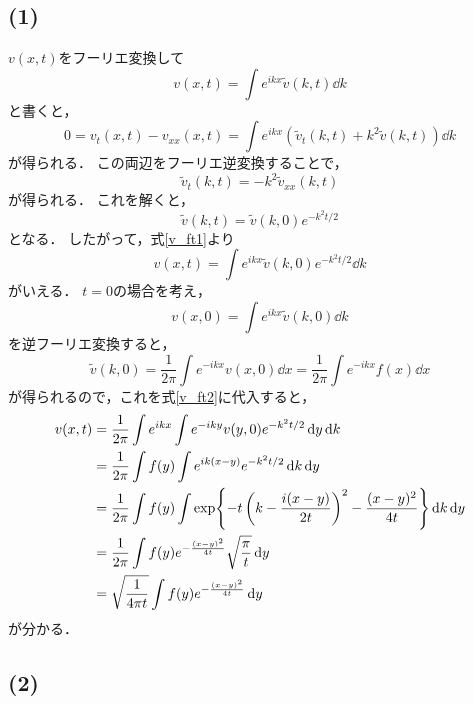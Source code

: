 \documentclass[a4paper,11pt]{jsarticle}
\begin{document}
\subsection*{(1)}
$v(x,t)$をフーリエ変換して
\begin{equation}
  v(x,t) = \int e^{ikx} \tilde{v}(k,t) \dd{k} \label{v_ft1}
\end{equation}
と書くと，
\begin{equation}
  0 = v_t(x,t) - v_{xx}(x,t) = \int e^{ikx} (\tilde{v}_t(k,t) + k^2 \tilde{v}(k,t)) \dd{k} 
\end{equation}
が得られる．
この両辺をフーリエ逆変換することで，
\begin{equation}
  \tilde{v}_t(k,t) = -k^2\tilde{v}_{xx}(k,t)
\end{equation}
が得られる．
これを解くと，
\begin{equation}
  \tilde{v}(k,t) = \tilde{v}(k,0)e^{-k^2t/2}
\end{equation}
となる．
したがって，式\eqref{v_ft1}より
\begin{equation}
  v(x,t) = \int e^{ikx} \tilde{v}(k,0)e^{-k^2t/2} \dd{k} \label{v_ft2}
\end{equation}
がいえる．
$t=0$の場合を考え，
\begin{equation}
  v(x,0) = \int e^{ikx} \tilde{v}(k,0) \dd{k}
\end{equation}
を逆フーリエ変換すると，
\begin{equation}
  \tilde{v}(k,0) = \frac{1}{2\pi}\int e^{-ikx} v(x,0) \dd{x} = \frac{1}{2\pi}\int e^{-ikx} f(x) \dd{x}
\end{equation}
が得られるので，これを式\eqref{v_ft2}に代入すると，
\begin{align}
  v(x,t) &= \frac{1}{2\pi} \int e^{ikx} \int e^{-iky} v(y,0) e^{-k^2t/2}  \dd{y}  \dd{k} \notag\\
  &= \frac{1}{2\pi} \int f(y) \int  e^{ik(x-y)} e^{-k^2t/2} \dd{k} \dd{y} \notag\\
  &= \frac{1}{2\pi} \int f(y) \int \exp{-t\left(k-\frac{i(x-y)}{2t}\right)^2-\frac{(x-y)^2}{4t}}   \dd{k}\dd{y} \notag\\
  &= \frac{1}{2\pi} \int f(y) e^{-\frac{(x-y)^2}{4t}} \sqrt{\frac{\pi}{t}} \dd{y} \notag\\
  &= \sqrt{\frac{1}{4\pi t}} \int  f(y) e^{-\frac{(x-y)^2}{4t}} \dd{y}
\end{align}
が分かる．

\subsection*{(2)}
\end{document}
